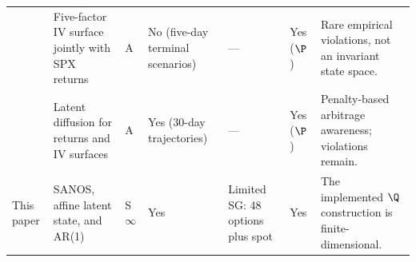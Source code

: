 \begin{landscape}
\begin{longtable}{@{}L{3.7cm}L{3.4cm}L{2.8cm}L{2.2cm}L{4.1cm}L{1.5cm}L{5.3cm}@{}}
  & Five-factor IV surface jointly with SPX returns & A & No (five-day terminal scenarios) & --- & Yes ($\P$) & Rare empirical violations, not an invariant state space. \\
\citet{BucheggerGonon2026}
  & Latent diffusion for returns and IV surfaces & A & Yes (30-day trajectories) & --- & Yes ($\P$) & Penalty-based arbitrage awareness; violations remain. \\
This paper
  & SANOS, affine latent state, and AR(1) & S$\infty$ & Yes & Limited SG: 48 options plus spot & Yes & The implemented $\Q$ construction is finite-dimensional. \\
\end{longtable}
\end{landscape}
